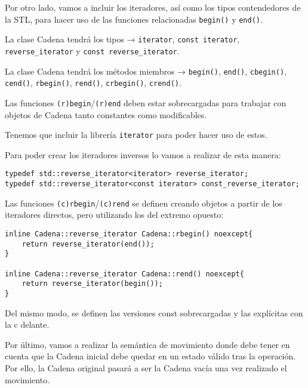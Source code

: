 Por otro lado, vamos a incluir los iteradores, así como los tipos contendedores de la STL, para hacer
uso de las funciones relacionadas \texttt{begin()} y \texttt{end()}.

La clase Cadena tendrá los tipos → \texttt{iterator}, \texttt{const iterator},
 \texttt{reverse\_iterator} y \texttt{const reverse\_iterator}.

La clase Cadena tendrá los métodos miembros → \texttt{begin()}, \texttt{end()}, \texttt{cbegin()}, 
 \texttt{cend()}, \texttt{rbegin()}, \texttt{rend()}, \texttt{crbegin()}, \texttt{crend()}.

Las funciones \texttt{(r)begin}/\texttt{(r)end} deben estar sobrecargadas para trabajar con 
objetos de Cadena tanto constantes como modificables.

Tenemos que incluir la librería \texttt{iterator} para poder hacer uso de estos.

Para poder crear los iteradores inversos lo vamos a realizar de esta manera:
\begin{center}
\begin{lstlisting}[frame=single]
typedef std::reverse_iterator<iterator> reverse_iterator;
typedef std::reverse_iterator<const iterator> const_reverse_iterator;
   \end{lstlisting}
\end{center}

Las funciones \texttt{(c)rbegin}/\texttt{(c)rend} se definen creando objetos a partir de los iteradores directos, pero utilizando los del extremo opuesto:
\begin{center}
    \begin{lstlisting}[frame=single]
inline Cadena::reverse_iterator Cadena::rbegin() noexcept{
    return reverse_iterator(end());
}

inline Cadena::reverse_iterator Cadena::rend() noexcept{
    return reverse_iterator(begin());
}   
\end{lstlisting}
\end{center}
Del mismo modo, se definen las versiones const sobrecargadas y las explícitas con la c delante.

Por último, vamos a realizar la semántica de movimiento donde debe tener en cuenta que la Cadena 
inicial debe quedar en un estado válido tras la operación. Por ello, la Cadena original pasará a 
ser la Cadena vacía una vez realizado el movimiento.

